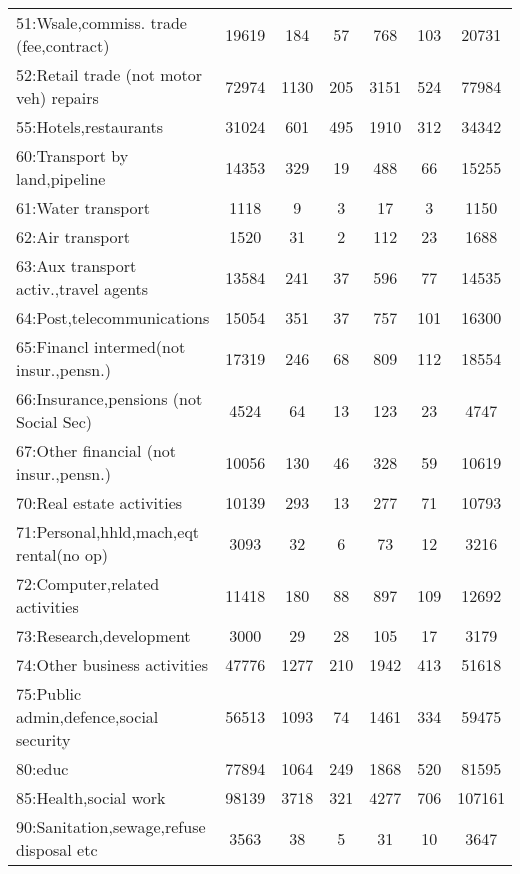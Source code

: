 {\begin{longtable}{l*{6}{c}}
51:Wsale,commiss. trade (fee,contract)&    19619&      184&       57&      768&      103&    20731\\
52:Retail trade (not motor veh) repairs&    72974&     1130&      205&     3151&      524&    77984\\
55:Hotels,restaurants&    31024&      601&      495&     1910&      312&    34342\\
60:Transport by land,pipeline&    14353&      329&       19&      488&       66&    15255\\
61:Water transport&     1118&        9&        3&       17&        3&     1150\\
62:Air transport&     1520&       31&        2&      112&       23&     1688\\
63:Aux transport activ.,travel agents&    13584&      241&       37&      596&       77&    14535\\
64:Post,telecommunications&    15054&      351&       37&      757&      101&    16300\\
65:Financl intermed(not insur.,pensn.)&    17319&      246&       68&      809&      112&    18554\\
66:Insurance,pensions (not Social Sec)&     4524&       64&       13&      123&       23&     4747\\
67:Other financial (not insur.,pensn.)&    10056&      130&       46&      328&       59&    10619\\
70:Real estate activities&    10139&      293&       13&      277&       71&    10793\\
71:Personal,hhld,mach,eqt rental(no op)&     3093&       32&        6&       73&       12&     3216\\
72:Computer,related activities&    11418&      180&       88&      897&      109&    12692\\
73:Research,development&     3000&       29&       28&      105&       17&     3179\\
74:Other business activities&    47776&     1277&      210&     1942&      413&    51618\\
75:Public admin,defence,social security&    56513&     1093&       74&     1461&      334&    59475\\
80:educ   &    77894&     1064&      249&     1868&      520&    81595\\
85:Health,social work&    98139&     3718&      321&     4277&      706&   107161\\
90:Sanitation,sewage,refuse disposal etc&     3563&       38&        5&       31&       10&     3647\\

\end{longtable}}
